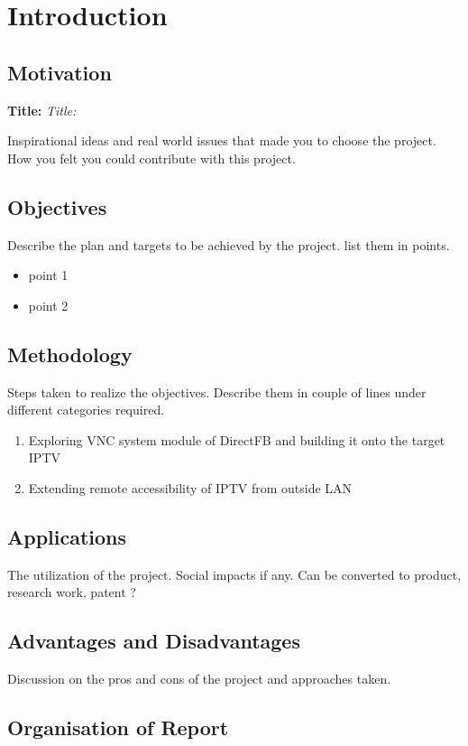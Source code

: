 \chapter{Introduction}

\section{Motivation}
\textbf{Title:} 
\textit{Title:}

Inspirational ideas and real world issues that made you to choose the project. How you felt you could contribute with this project.

\section{Objectives}
Describe the plan and targets to be achieved by the project. list them in points.

\begin{itemize}
	\item point 1
	\item point 2
\end{itemize} 

\section{Methodology}
Steps taken to realize the objectives. Describe them in couple of lines under different categories required.
\begin{enumerate}
\item Exploring VNC system module of DirectFB and building it onto the target IPTV
\item Extending remote accessibility of IPTV from outside LAN
\end{enumerate}

\section{Applications}
The utilization of the project. Social impacts if any. Can be converted to product, research work, patent ?

\section{Advantages and Disadvantages}
Discussion on the pros and cons of the project and approaches taken.\\

\section{Organisation of Report}

